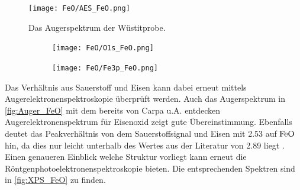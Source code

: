         \begin{figure}
            \centering
            \texttt{[image: FeO/AES\_FeO.png]}
            \caption{Das Augerspektrum der Wüstitprobe.}
            \label{fig:Auger_FeO}
        \end{figure}
        \begin{figure}
            \centering
            \begin{subfigure}[t]{0.48\textwidth}
                \centering
                \texttt{[image: FeO/O1s\_FeO.png]}
                \label{fig:XPSO1s_FeO}
            \end{subfigure}
            \begin{subfigure}[t]{0.48\textwidth}
                \centering
                \texttt{[image: FeO/Fe3p\_FeO.png]}
                \label{fig:XPSFe3p_FeO}
            \end{subfigure}
            \caption{}
            \label{fig:XPS_FeO}
        \end{figure}
        Das Verhältnis aus Sauerstoff und Eisen kann dabei erneut mittels Augerelektronenspektroskopie überprüft werden.
        Auch das Augerspektrum in \autoref{fig:Auger_FeO} mit dem bereits von Carpa u.A. \cite{FeO_1} entdecken Augerelektronenspektrum für Eisenoxid zeigt gute Übereinstimmung.
        Ebenfalls deutet das Peakverhältnis von dem Sauerstoffsignal und Eisen mit \num{2.53} auf $\ce{FeO}$ hin, da dies nur leicht unterhalb des Wertes aus der Literatur von \num{2.89} liegt \cite{FeO_1}.
        Einen genaueren Einblick welche Struktur vorliegt kann erneut die Röntgenphotoelektronenspektroskopie bieten.
        Die entsprechenden Spektren sind in \autoref{fig:XPS_FeO} zu finden.

